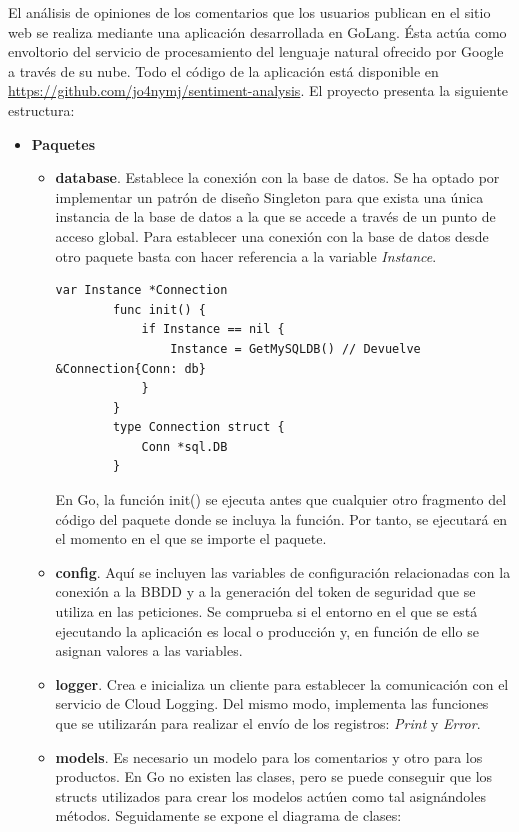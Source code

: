El análisis de opiniones de los comentarios que los usuarios publican en el sitio web se realiza mediante una aplicación desarrollada en GoLang. Ésta actúa como envoltorio del servicio de procesamiento del lenguaje natural ofrecido por Google a través de su nube. Todo el código de la aplicación está disponible en \url{https://github.com/jo4nymj/sentiment-analysis}. El proyecto presenta la siguiente estructura:
\begin{itemize}
    \item \textbf{Paquetes}
    \begin{itemize}
        \item \textbf{database}. Establece la conexión con la base de datos. Se ha optado por implementar un patrón de diseño Singleton para que exista una única instancia de la base de datos a la que se accede a través de un punto de acceso global. Para establecer una conexión con la base de datos desde otro paquete basta con hacer referencia a la variable \textit{Instance}. 
        
        \begin{lstlisting}[caption= Singleton]
        var Instance *Connection
        func init() {
        	if Instance == nil {
        		Instance = GetMySQLDB() // Devuelve &Connection{Conn: db}
        	}
        }
        type Connection struct {
        	Conn *sql.DB
        }
        \end{lstlisting}
        
        En Go, la función init() se ejecuta antes que cualquier otro fragmento del código del paquete donde se incluya la función. Por tanto, se ejecutará en el momento en el que se importe el paquete.
        
        \item \textbf{config}. Aquí se incluyen las variables de configuración relacionadas con la conexión a la BBDD y a la generación del token de seguridad que se utiliza en las peticiones. Se comprueba si el entorno en el que se está ejecutando la aplicación es local o producción y, en función de ello se asignan valores a las variables.
        
        \item \textbf{logger}. Crea e inicializa un cliente para establecer la comunicación con el servicio de Cloud Logging. Del mismo modo, implementa las funciones que se utilizarán para realizar el envío de los registros: \textit{Print} y \textit{Error}.
        
        \item \textbf{models}. Es necesario un modelo para los comentarios y otro para los productos. En Go no existen las clases, pero se puede conseguir que los structs utilizados para crear los modelos actúen como tal asignándoles métodos. Seguidamente se expone el diagrama de clases:
        

\end{itemize}
\end{itemize}
